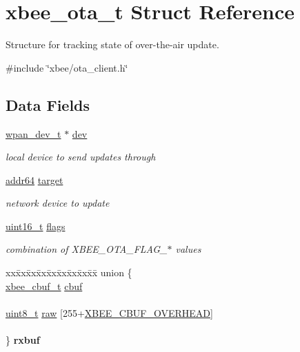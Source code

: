 \hypertarget{structxbee__ota__t}{}\section{xbee\+\_\+ota\+\_\+t Struct Reference}
\label{structxbee__ota__t}


Structure for tracking state of over-\/the-\/air update.  




{\ttfamily \#include \char`\"{}xbee/ota\+\_\+client.\+h\char`\"{}}

\subsection*{Data Fields}
\begin{DoxyCompactItemize}
\item 
\hyperlink{structwpan__dev__t}{wpan\+\_\+dev\+\_\+t} $\ast$ \hyperlink{group__xbee__ota__client_gaa7262b389539547f7405189cd4bf274c}{dev}
\begin{DoxyCompactList}\small\item\em local device to send updates through \end{DoxyCompactList}\item 
\hyperlink{unionaddr64}{addr64} \hyperlink{group__xbee__ota__client_gaef649f9dfe9109ac17db3fda73c61036}{target}
\begin{DoxyCompactList}\small\item\em network device to update \end{DoxyCompactList}\item 
\hyperlink{group__hal__dos_ga5a8b2dc9e45a9ee81a94ef304fb62505}{uint16\+\_\+t} \hyperlink{group__xbee__ota__client_ga1e87af3c18a2fd36c61faf89949bdc3f}{flags}
\begin{DoxyCompactList}\small\item\em combination of X\+B\+E\+E\+\_\+\+O\+T\+A\+\_\+\+F\+L\+A\+G\+\_\+$\ast$ values \end{DoxyCompactList}\item 
\begin{tabbing}
xx\=xx\=xx\=xx\=xx\=xx\=xx\=xx\=xx\=\kill
union \{\\
\>\hyperlink{structxbee__cbuf__t}{xbee\_cbuf\_t} \hyperlink{group__xbee__ota__client_gaa86751bccf68cd96c559cd1947e455c9}{cbuf}\\
\>\\
\>\hyperlink{group__hal__dos_gae1affc9ca37cfb624959c866a73f83c2}{uint8\_t} \hyperlink{group__xbee__ota__client_gafaab4db801ec47fb901e28ee4c4eac04}{raw} \mbox{[}255+\hyperlink{group__util__cbuf_ga6fb73f000c9aa3d2b26f3ae089676bfa}{XBEE\_CBUF\_OVERHEAD}\mbox{]}\\
\>\\
\} {\bfseries rxbuf}\\


\end{tabbing}
\end{DoxyCompactItemize}
